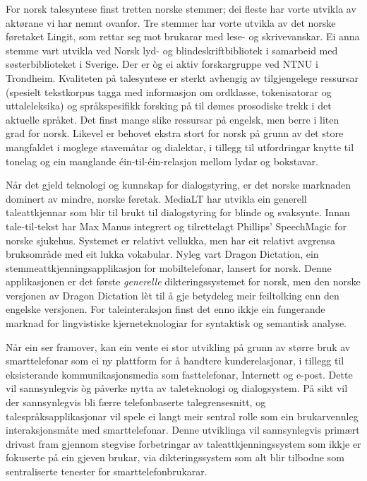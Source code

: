\begin{multicols}{2}
For norsk talesyntese finst tretten norske stemmer; dei fleste har vorte utvikla av aktørane vi har nemnt ovanfor. 
Tre stemmer har vorte utvikla av det norske føretaket Lingit, som rettar seg mot brukarar med lese- og skrivevanskar. 
Ei anna stemme vart utvikla ved Norsk lyd- og blindeskriftbibliotek i samarbeid med søsterbiblioteket i Sverige. 
Der er òg ei aktiv forskargruppe ved NTNU i Trondheim. 
Kvaliteten på talesyntese er sterkt avhengig av tilgjengelege ressursar (spesielt tekstkorpus tagga med informasjon om ordklasse, tokenisatorar og uttaleleksika) og språkspesifikk forsking på til dømes prosodiske trekk i det aktuelle språket. 
Det finst mange slike ressursar på engelsk, men berre i liten grad for norsk. Likevel er behovet ekstra stort for norsk på grunn av det store mangfaldet i moglege stavemåtar og dialektar, i tillegg til utfordringar knytte til tonelag og ein manglande éin-til-éin-relasjon mellom lydar og bokstavar. 

Når det gjeld teknologi og kunnskap for dialogstyring, er det norske marknaden dominert av mindre, norske føretak. 
MediaLT har utvikla ein generell taleattkjennar som blir til brukt til dialogstyring for blinde og svaksynte. 
Innan tale-til-tekst har Max Manus integrert og tilrettelagt Phillips’ SpeechMagic for norske sjukehus. 
Systemet er relativt vellukka, men har eit relativt avgrensa bruksområde med eit lukka vokabular. 
Nyleg vart Dragon Dictation, ein stemmeattkjenningsapplikasjon for mobiltelefonar, lansert for norsk. 
Denne applikasjonen er det første \textit{generelle} dikteringssystemet for norsk, men den norske versjonen av Dragon Dictation lèt til å gje betydeleg meir feiltolking enn den engelske versjonen. 
For taleinteraksjon finst det enno ikkje ein fungerande marknad for lingvistiske kjerneteknologiar for syntaktisk og semantisk analyse. 

Når ein ser framover, kan ein vente ei stor utvikling på grunn av større bruk av smarttelefonar som ei ny plattform for å handtere kunderelasjonar, i tillegg til eksisterande kommunikasjonsmedia som fasttelefonar, Internett og e-post. 
Dette vil sannsynlegvis òg påverke nytta av taleteknologi og dialogsystem. På sikt vil der sannsynlegvis bli færre telefonbaserte talegrensesnitt, og talespråksapplikasjonar vil spele ei langt meir sentral rolle som ein brukarvennleg interaksjonsmåte med smarttelefonar. 
Denne utviklinga vil sannsynlegvis primært drivast fram gjennom stegvise forbetringar av taleattkjenningssystem som ikkje er fokuserte på ein gjeven brukar, via dikteringssystem som alt blir tilbodne som sentraliserte tenester for smarttelefonbrukarar. 


\end{multicols}
